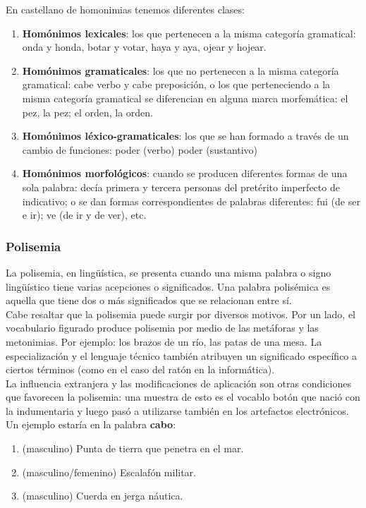 \documentclass[../all.tex]{subfiles}
\begin{document}
	En castellano de homonimias tenemos diferentes clases:
	
	\begin{enumerate}[resume]
		\setcounter{enumi}{0}
		\item \textbf{Homónimos lexicales}: los que pertenecen a la misma categoría gramatical: onda y honda, botar y votar, haya y aya, ojear y hojear.
		\item \textbf{Homónimos gramaticales}: los que no pertenecen a la misma categoría gramatical: cabe verbo y cabe preposición, o los que perteneciendo a la misma categoría gramatical se diferencian en alguna marca morfemática: el pez, la pez; el orden, la orden.
		\item \textbf{Homónimos léxico-gramaticales}: los que se han formado a través de un cambio de funciones: poder (verbo) poder (sustantivo)
		\item \textbf{Homónimos morfológicos}: cuando se producen diferentes formas de una sola palabra: decía primera y tercera personas del pretérito imperfecto de indicativo; o se dan formas correspondientes de palabras diferentes: fui (de ser e ir); ve (de ir y de ver), etc.
	\end{enumerate}

\subsubsection{Polisemia}
	La polisemia, en lingüística, se presenta cuando una misma palabra o signo lingüístico tiene varias acepciones o significados. Una palabra polisémica es aquella que tiene dos o más significados que se relacionan entre sí\cite{HomonimiaPolisemia}.\\
	
	Cabe resaltar que la polisemia puede surgir por diversos motivos. Por un lado, el vocabulario figurado produce polisemia por medio de las metáforas y las metonimias. Por ejemplo: los brazos de un río, las patas de una mesa. La especialización y el lenguaje técnico también atribuyen un significado específico a ciertos términos (como en el caso del ratón en la informática).\\
	
	La influencia extranjera y las modificaciones de aplicación son otras condiciones que favorecen la polisemia: una muestra de esto es el vocablo botón que nació con la indumentaria y luego pasó a utilizarse también en los artefactos electrónicos.\\
	
	Un ejemplo estaría en la palabra \textbf{cabo}:
	\begin{enumerate}[resume]
		\setcounter{enumi}{0}
		\item (masculino) Punta de tierra que penetra en el mar.
		\item (masculino/femenino) Escalafón militar.
		\item (masculino) Cuerda en jerga náutica.
	\end{enumerate}
\newpage
\end{document}

